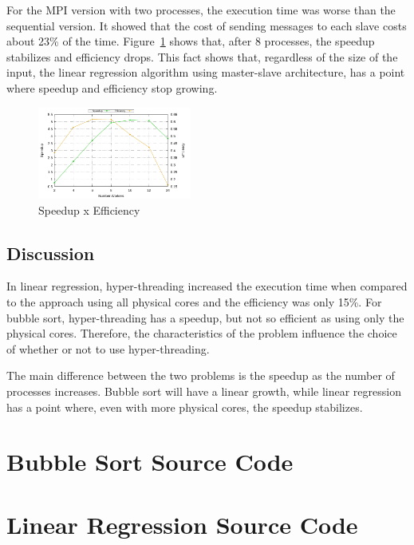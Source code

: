 \documentclass[10pt, twocolumn]{report}
\begin{document}
For the MPI version with two processes, the execution time was worse than the sequential version. It showed that the cost of sending messages to each slave costs about 23\% of the time. Figure~\ref{fig:linear-regression-speedup-efficiency} shows that, after 8 processes, the speedup stabilizes and efficiency drops. This fact shows that, regardless of the size of the input, the linear regression algorithm using master-slave architecture, has a point where speedup and efficiency stop growing.

\begin{figure}[ht]
	\centering
	\includegraphics[width=0.45\textwidth]{../logs/scripts/linear-regression-speedup-efficiency.pdf}
	\caption{Speedup x Efficiency}
	\label{fig:linear-regression-speedup-efficiency}
\end{figure}

\section{Discussion}
In linear regression, hyper-threading increased the execution time when compared to the approach using all physical cores and the efficiency was only 15\%. For bubble sort, hyper-threading has a speedup, but not so efficient as using only the physical cores. Therefore, the characteristics of the problem influence the choice of whether or not to use hyper-threading.

The main difference between the two problems is the speedup as the number of processes increases. Bubble sort will have a linear growth, while linear regression has a point where, even with more physical cores, the speedup stabilizes.

\begin{appendices}
	\chapter{Bubble Sort Source Code}
	
	
	

	\chapter{Linear Regression Source Code}
	
	
	
\end{appendices}
\end{document}

